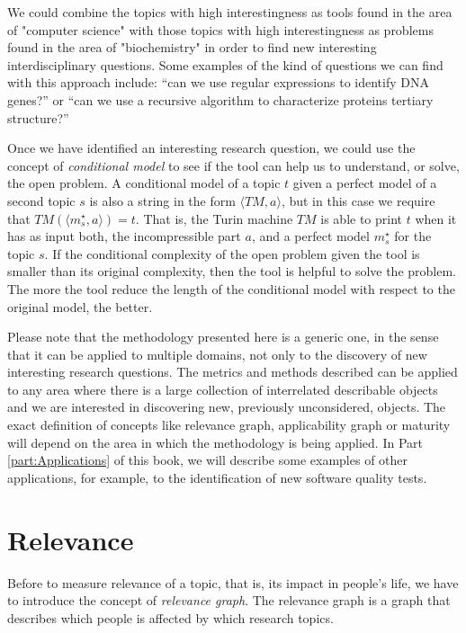\begin{example}
We could combine the topics with high interestingness as tools found in the area of "computer science" with those topics with high interestingness as problems found in the area of "biochemistry" in order to find new interesting interdisciplinary questions. Some examples of the kind of questions we can find with this approach include: “can we use regular expressions to identify DNA genes?” or “can we use a recursive algorithm to characterize proteins tertiary structure?”
\end{example}

Once we have identified an interesting research question, we could use the concept of \emph{conditional model} to see if the tool can help us to understand, or solve, the open problem. A conditional model of a topic $t$ given a perfect model of a second topic $s$ is also a string in the form $\langle TM,a \rangle$, but in this case we require that $TM \left(\langle m_s^\star, a \rangle \right) = t$. That is, the Turin machine $TM$ is able to print $t$ when it has as input both, the incompressible part $a$, and a perfect model $m_s^\star$ for the topic $s$. If the conditional complexity of the open problem given the tool is smaller than its original complexity, then the tool is helpful to solve the problem. The more the tool reduce the length of the conditional model with respect to the original model, the better.

Please note that the methodology presented here is a generic one, in the sense that it can be applied to multiple domains, not only to the discovery of new interesting research questions. The metrics and methods described can be applied to any area where there is a large collection of interrelated describable objects and we are interested in discovering new, previously unconsidered, objects. The exact definition of concepts like relevance graph, applicability graph or maturity will depend on the area in which the methodology is being applied. In Part \ref{part:Applications} of this book, we will describe some examples of other applications, for example, to the identification of new software quality tests.

%
%

\section{Relevance}

Before to measure relevance of a topic, that is, its impact in people's life, we have to introduce the concept of \emph{relevance graph}. The relevance graph is a graph that describes which people is affected by which research topics.

